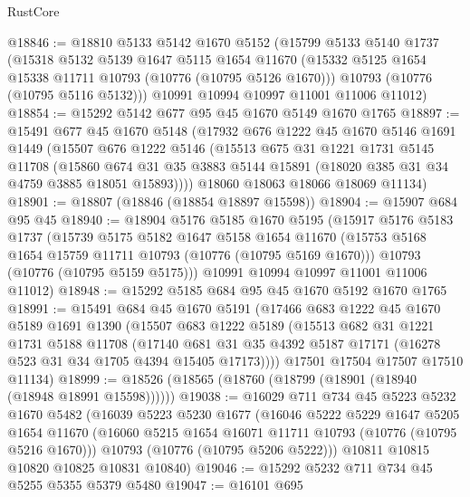 \begin{lexlean}{RustCore}
\begin{coremodule}
@18846 := @18810
    @5133
    @5142
    @1670
    @5152
    (@15799
      @5133
      @5140
      @1737
      (@15318
        @5132
        @5139
        @1647
        @5115
        @1654
        @11670
        (@15332 @5125 @1654 @15338 @11711 @10793 (@10776 (@10795 @5126 @1670)))
        @10793
        (@10776 (@10795 @5116 @5132)))
      @10991
      @10994
      @10997
      @11001
      @11006
      @11012)
@18854 := @15292 @5142 @677 @95 @45 @1670 @5149 @1670 @1765
@18897 := @15491
    @677
    @45
    @1670
    @5148
    (@17932
      @676
      @1222
      @45
      @1670
      @5146
      @1691
      @1449
      (@15507
        @676
        @1222
        @5146
        (@15513
          @675
          @31
          @1221
          @1731
          @5145
          @11708
          (@15860 @674 @31 @35 @3883 @5144 @15891 (@18020 @385 @31 @34 @4759 @3885 @18051 @15893))))
      @18060
      @18063
      @18066
      @18069
      @11134)
@18901 := @18807 (@18846 (@18854 @18897 @15598))
@18904 := @15907 @684 @95 @45
@18940 := @18904
    @5176
    @5185
    @1670
    @5195
    (@15917
      @5176
      @5183
      @1737
      (@15739
        @5175
        @5182
        @1647
        @5158
        @1654
        @11670
        (@15753 @5168 @1654 @15759 @11711 @10793 (@10776 (@10795 @5169 @1670)))
        @10793
        (@10776 (@10795 @5159 @5175)))
      @10991
      @10994
      @10997
      @11001
      @11006
      @11012)
@18948 := @15292 @5185 @684 @95 @45 @1670 @5192 @1670 @1765
@18991 := @15491
    @684
    @45
    @1670
    @5191
    (@17466
      @683
      @1222
      @45
      @1670
      @5189
      @1691
      @1390
      (@15507
        @683
        @1222
        @5189
        (@15513
          @682
          @31
          @1221
          @1731
          @5188
          @11708
          (@17140 @681 @31 @35 @4392 @5187 @17171 (@16278 @523 @31 @34 @1705 @4394 @15405 @17173))))
      @17501
      @17504
      @17507
      @17510
      @11134)
@18999 := @18526 (@18565 (@18760 (@18799 (@18901 (@18940 (@18948 @18991 @15598))))))
@19038 := @16029
    @711
    @734
    @45
    @5223
    @5232
    @1670
    @5482
    (@16039
      @5223
      @5230
      @1677
      (@16046
        @5222
        @5229
        @1647
        @5205
        @1654
        @11670
        (@16060 @5215 @1654 @16071 @11711 @10793 (@10776 (@10795 @5216 @1670)))
        @10793
        (@10776 (@10795 @5206 @5222)))
      @10811
      @10815
      @10820
      @10825
      @10831
      @10840)
@19046 := @15292 @5232 @711 @734 @45 @5255 @5355 @5379 @5480
@19047 := @16101 @695

\end{coremodule}
\end{lexlean}
